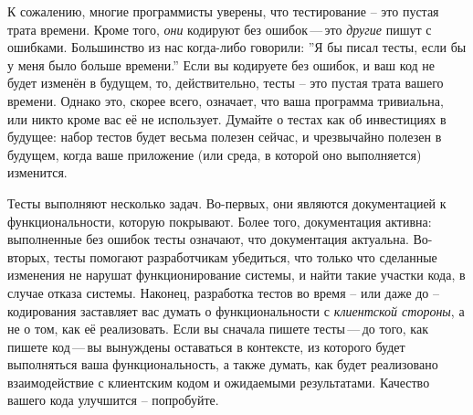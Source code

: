 \documentclass[a4paper,10pt,twoside]{book}
\begin{document}
К сожалению, многие программисты уверены, что тестирование – это пустая трата времени.
Кроме того, \emph{они} кодируют без ошибок\,---\,это \emph{другие} пишут с ошибками.
Большинство из нас когда-либо говорили: ''Я бы писал тесты, если бы у меня было больше времени.''
Если вы кодируете без ошибок, и ваш код не будет изменён в будущем,
то, действительно, тесты – это пустая трата вашего времени.
Однако это, скорее всего, означает, что ваша программа тривиальна,
или никто кроме вас её не использует.
Думайте о тестах как об инвестициях в будущее:
набор тестов будет весьма полезен сейчас,
и чрезвычайно полезен в будущем, когда ваше приложение (или среда, в которой оно выполняется)
изменится.

Тесты выполняют несколько задач. Во-первых, они являются документацией к функциональности, которую покрывают.
Более того, документация активна: выполненные без ошибок тесты означают, что документация актуальна.
Во-вторых, тесты помогают разработчикам убедиться, что только что сделанные изменения
не нарушат функционирование системы, и
найти такие участки кода, в случае отказа системы.
Наконец, разработка тестов во время – или даже до – кодирования
заставляет вас думать о функциональности с \emph{клиентской стороны},
а не о том, как её реализовать.
Если вы сначала пишете тесты\,---\,до того, как пишете код\,---\,вы вынуждены оставаться в контексте,
из которого будет выполняться ваша функциональность,
а также думать, как будет реализовано взаимодействие с клиентским кодом и ожидаемыми результатами.
Качество вашего кода улучшится – попробуйте.
\end{document}
